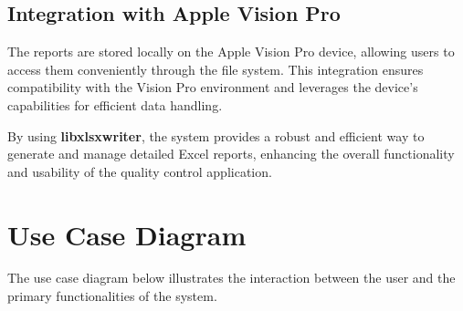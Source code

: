 
\subsection{Integration with Apple Vision Pro}
The reports are stored locally on the Apple Vision Pro device, allowing users to access them conveniently through the file system. This integration ensures compatibility with the Vision Pro environment and leverages the device's capabilities for efficient data handling.

By using \textbf{libxlsxwriter}, the system provides a robust and efficient way to generate and manage detailed Excel reports, enhancing the overall functionality and usability of the quality control application.



\section{Use Case Diagram}
The use case diagram below illustrates the interaction between the user and the primary functionalities of the system.



